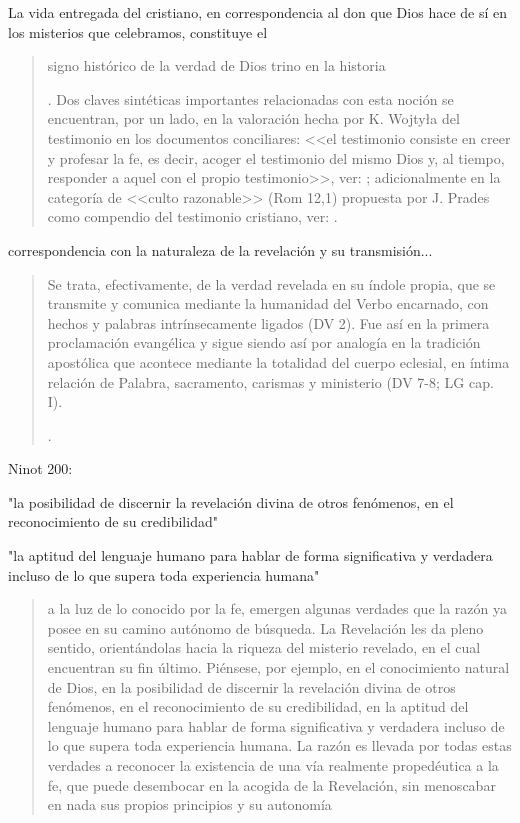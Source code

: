 La vida entregada del cristiano, en correspondencia al don que Dios hace de sí en los misterios que celebramos, constituye el \blockquote[{\Cite[Cf.][399]{prades2015testimonio}. Dos claves sintéticas importantes relacionadas con esta noción se encuentran, por un lado, en la valoración hecha por K. Wojtyła del testimonio en los documentos conciliares: <<el testimonio consiste en creer y profesar la fe, es decir, acoger el testimonio del mismo Dios y, al tiempo, responder a aquel con el propio testimonio>>, ver: \Cite[194-197]{prades2015testimonio}; adicionalmente en la categoría de <<culto razonable>> (Rom 12,1) propuesta por J. Prades como compendio del testimonio cristiano, ver: \Cite[405-430]{prades2015testimonio}.}]{signo histórico de la verdad de Dios trino en la historia}. correspondencia con la naturaleza de la revelación y su transmisión...
\blockquote[{\Cite[419-420]{prades2015testimonio}}.]{Se trata, efectivamente, de la verdad revelada en su índole propia, que se transmite y comunica mediante la humanidad del Verbo encarnado, con hechos y palabras intrínsecamente ligados (DV 2). Fue así en la primera proclamación evangélica y sigue siendo así por analogía en la tradición apostólica que acontece mediante la totalidad del cuerpo eclesial, en íntima relación de Palabra, sacramento, carismas y ministerio (DV 7-8; LG cap. I).}

Ninot 200:

"la posibilidad de discernir la revelación divina de otros fenómenos, en el reconocimiento de su credibilidad"

"la aptitud del lenguaje humano para hablar de forma significativa y verdadera incluso de lo que supera toda experiencia humana"

\blockquote[][\,(FR 67)]{a la luz de lo conocido por la fe, emergen algunas verdades que la razón ya posee en su camino autónomo de búsqueda. La Revelación les da pleno sentido, orientándolas hacia la riqueza del misterio revelado, en el cual encuentran su fin último. Piénsese, por ejemplo, en el conocimiento natural de Dios, en la posibilidad de discernir la revelación divina de otros fenómenos, en el reconocimiento de su credibilidad, en la aptitud del lenguaje humano para hablar de forma significativa y verdadera incluso de lo que supera toda experiencia humana. La razón es llevada por todas estas verdades a reconocer la existencia de una vía realmente propedéutica a la fe, que puede desembocar en la acogida de la Revelación, sin menoscabar en nada sus propios principios y su autonomía}.

